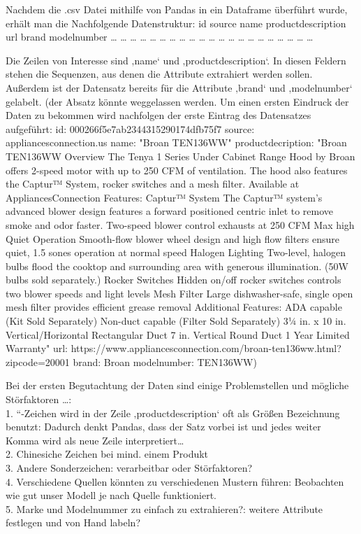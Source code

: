 \documentclass[paper=a4,12pt,listof=totoc]{scrartcl}%
\begin{document}
		Nachdem die .csv Datei mithilfe von Pandas in ein Dataframe überführt wurde, erhält man die Nachfolgende Datenstruktur:
		id	source	name 	productdescription	url	brand	modelnumber
		…	…	…	…	…	…	…
		…	…	…	…	…	…	…
		…	…	…	…	…	…	…
		
		Die Zeilen von Interesse sind ‚name‘ und ‚productdescription‘. In diesen Feldern stehen die Sequenzen, aus denen die Attribute extrahiert werden sollen. Außerdem ist der Datensatz bereits für die Attribute ‚brand‘ und ‚modelnumber‘ gelabelt. 
		(der Absatz könnte weggelassen werden. Um einen ersten Eindruck der Daten zu bekommen wird nachfolgen der erste Eintrag des Datensatzes aufgeführt:
		id: 000266f5e7ab2344315290174dfb75f7
		source: appliancesconnection.us
		name: "Broan TEN136WW"
		productdecription: "Broan TEN136WW Overview The Tenya 1 Series Under Cabinet Range Hood by Broan offers 2-speed motor with up to 250 CFM of ventilation. The hood also features the Captur™ System, rocker switches and a mesh filter. Available at AppliancesConnection Features: Captur™ System The Captur™ system’s advanced blower design features a forward positioned centric inlet to remove smoke and odor faster. Two-speed blower control exhausts at 250 CFM Max high Quiet Operation Smooth-flow blower wheel design and high flow filters ensure quiet, 1.5 sones operation at normal speed Halogen Lighting Two-level, halogen bulbs flood the cooktop and surrounding area with generous illumination. (50W bulbs sold separately.) Rocker Switches Hidden on/off rocker switches controls two blower speeds and light levels Mesh Filter Large dishwasher-safe, single open mesh filter provides efficient grease removal Additional Features: ADA capable (Kit Sold Separately) Non-duct capable (Filter Sold Separately) 3¼ in. x 10 in. Vertical/Horizontal Rectangular Duct 7 in. Vertical Round Duct 1 Year Limited Warranty"
		url: https://www.appliancesconnection.com/broan-ten136ww.html?zipcode=20001
		brand: Broan
		modelnumber: TEN136WW)
		
		Bei der ersten Begutachtung der Daten sind einige Problemstellen und mögliche Störfaktoren …:\\
		1.	“-Zeichen wird in der Zeile ‚productdescription‘ oft als Größen Bezeichnung benutzt: Dadurch denkt Pandas, dass der Satz vorbei ist und jedes weiter Komma wird als neue Zeile interpretiert…\\
		2.	Chinesiche Zeichen bei mind. einem Produkt\\
		3.	Andere Sonderzeichen: verarbeitbar oder Störfaktoren?\\
		4.	Verschiedene Quellen könnten zu verschiedenen Mustern führen: Beobachten wie gut unser Modell je nach Quelle funktioniert.\\
		5.	Marke und Modelnummer zu einfach zu extrahieren?: weitere Attribute festlegen und von Hand labeln?\\
		
		
	\printbibliography[title=Literaturverzeichnis]
\end{document}
